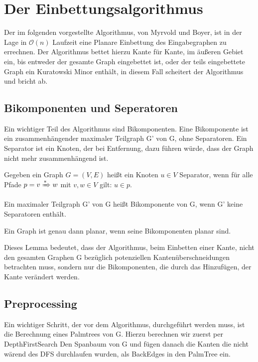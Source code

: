 \documentclass[runningheads]{llncs}
\begin{document}
\section{Der Einbettungsalgorithmus}
    Der im folgenden vorgestellte Algorithmus, von Myrvold und Boyer, ist in der Lage in $\mathcal{O}(n)$ Laufzeit eine Planare Einbettung
    des Eingabegraphen zu errechnen. Der Algorithmus bettet hierzu Kante für Kante, im äußeren Gebiet ein, bis entweder der gesamte Graph eingebettet ist, oder
    der teils eingebettete Graph ein Kuratowski Minor enthält, in diesem Fall scheitert der Algorithmus und bricht ab.
    
    \subsection{Bikomponenten und Seperatoren}
    Ein wichtiger Teil des Algorithmus sind Bikomponenten. Eine Bikomponente ist ein zusammenhängender maximaler Teilgraph G' von G, ohne Separatoren.
    Ein Separator ist ein Knoten, der bei Entfernung, dazu führen würde, dass der Graph nicht mehr zusammenhängend ist.

    
    \begin{definition}[Separator]
        Gegeben ein Graph $G=(V,E)$ heißt ein Knoten $u \in V$ Separator, wenn für alle Pfade $p = v \xRightarrow{*} w$ mit $v,w \in V$
        gilt: $u \in p$.
    \end{definition}
    \begin{definition}[Bikomponente]
        Ein  maximaler Teilgraph G' von G heißt Bikomponente von G, wenn G' keine Separatoren enthält.
    \end{definition}
    \begin{lemma}
        Ein Graph ist genau dann planar, wenn seine Bikomponenten planar sind.
    \end{lemma}
    
    Dieses Lemma bedeutet, dass der Algorithmus, beim Einbetten einer Kante, nicht den gesamten Graphen G bezüglich potenziellen Kantenüberschneidungen 
    betrachten muss, sondern nur die Bikomponenten, die durch das Hinzufügen, der Kante verändert werden.

    \subsection{Preprocessing}
    Ein wichtiger Schritt, der vor dem Algorithmus, durchgeführt werden muss, 
    ist die Berechnung eines Palmtrees von G. Hierzu berechnen wir zuerst per DepthFirstSearch 
    Den Spanbaum von G und fügen danach die Kanten die nicht wärend des DFS durchlaufen wurden, als BackEdges in den PalmTree ein. 
\end{document}
